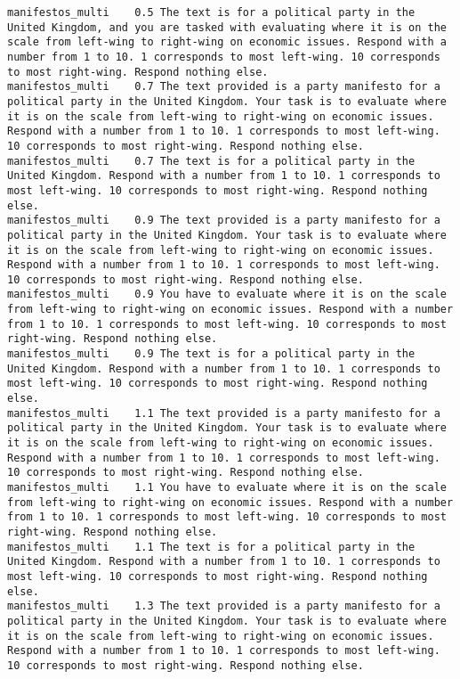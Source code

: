 \begin{lstlisting}[label=lst:promptvariants]
manifestos_multi	0.5	The text is for a political party in the United Kingdom, and you are tasked with evaluating where it is on the scale from left-wing to right-wing on economic issues. Respond with a number from 1 to 10. 1 corresponds to most left-wing. 10 corresponds to most right-wing. Respond nothing else.
manifestos_multi	0.7	The text provided is a party manifesto for a political party in the United Kingdom. Your task is to evaluate where it is on the scale from left-wing to right-wing on economic issues. Respond with a number from 1 to 10. 1 corresponds to most left-wing. 10 corresponds to most right-wing. Respond nothing else.
manifestos_multi	0.7	The text is for a political party in the United Kingdom. Respond with a number from 1 to 10. 1 corresponds to most left-wing. 10 corresponds to most right-wing. Respond nothing else.
manifestos_multi	0.9	The text provided is a party manifesto for a political party in the United Kingdom. Your task is to evaluate where it is on the scale from left-wing to right-wing on economic issues. Respond with a number from 1 to 10. 1 corresponds to most left-wing. 10 corresponds to most right-wing. Respond nothing else.
manifestos_multi	0.9	You have to evaluate where it is on the scale from left-wing to right-wing on economic issues. Respond with a number from 1 to 10. 1 corresponds to most left-wing. 10 corresponds to most right-wing. Respond nothing else.
manifestos_multi	0.9	The text is for a political party in the United Kingdom. Respond with a number from 1 to 10. 1 corresponds to most left-wing. 10 corresponds to most right-wing. Respond nothing else.
manifestos_multi	1.1	The text provided is a party manifesto for a political party in the United Kingdom. Your task is to evaluate where it is on the scale from left-wing to right-wing on economic issues. Respond with a number from 1 to 10. 1 corresponds to most left-wing. 10 corresponds to most right-wing. Respond nothing else.
manifestos_multi	1.1	You have to evaluate where it is on the scale from left-wing to right-wing on economic issues. Respond with a number from 1 to 10. 1 corresponds to most left-wing. 10 corresponds to most right-wing. Respond nothing else.
manifestos_multi	1.1	The text is for a political party in the United Kingdom. Respond with a number from 1 to 10. 1 corresponds to most left-wing. 10 corresponds to most right-wing. Respond nothing else.
manifestos_multi	1.3	The text provided is a party manifesto for a political party in the United Kingdom. Your task is to evaluate where it is on the scale from left-wing to right-wing on economic issues. Respond with a number from 1 to 10. 1 corresponds to most left-wing. 10 corresponds to most right-wing. Respond nothing else.

\end{lstlisting}
